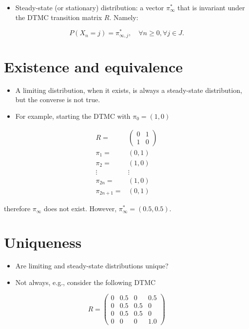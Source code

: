 \documentclass[10pt]{article}
\begin{document}
\begin{itemize}
  \item Steady-state (or stationary) distribution: a vector $\pi_{\infty}^{*}$ that is invariant under the DTMC transition matrix $R$. Namely:
\end{itemize}

$$
P\left(X_{n}=j\right)=\pi_{\infty, j}^{*}, \quad \forall n \geq 0, \forall j \in J .
$$

\section*{Existence and equivalence}
\begin{itemize}
  \item A limiting distribution, when it exists, is always a steady-state distribution, but the converse is not true.
  \item For example, starting the DTMC with $\pi_{0}=(1,0)$
\end{itemize}

$$
\begin{aligned}
R= & \left(\begin{array}{ll}
0 & 1 \\
1 & 0
\end{array}\right) \\
\pi_{1}= & (0,1) \\
\pi_{2}= & (1,0) \\
\vdots & \vdots \\
\pi_{2 n}= & (1,0) \\
\pi_{2 n+1}= & (0,1)
\end{aligned}
$$

therefore $\pi_{\infty}$ does not exist. However, $\pi_{\infty}^{*}=(0.5,0.5)$.

\section*{Uniqueness}
\begin{itemize}
  \item Are limiting and steady-state distributions unique?
  \item Not always, e.g., consider the following DTMC
\end{itemize}

$$
R=\left(\begin{array}{cccc}
0 & 0.5 & 0 & 0.5 \\
0 & 0.5 & 0.5 & 0 \\
0 & 0.5 & 0.5 & 0 \\
0 & 0 & 0 & 1.0
\end{array}\right)
$$
\end{document}
